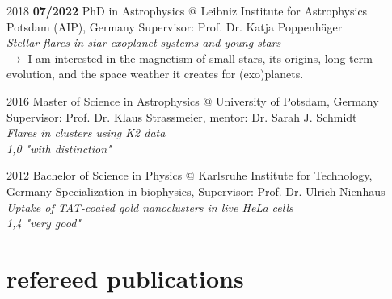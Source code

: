 \documentclass[9.5pt]{k-cv} %
\begin{document}
\begin{entrylist}
\entry
{2018 \to \textbf{07/2022}}
{PhD {\normalfont in Astrophysics} @ Leibniz Institute for Astrophysics Potsdam (AIP), Germany}
{}
{Supervisor: Prof. Dr. Katja Poppenh\"ager\\
\emph{Stellar flares in star-exoplanet systems and young stars}\vspace{.3cm}\\
$\rightarrow$ I am interested in the magnetism of small stars, its origins, long-term evolution, and the space weather it creates for (exo)planets.\vspace{.3cm}}

\entry
{2016 }
{Master {\normalfont of Science in Astrophysics} @ University of Potsdam, Germany}
{}
{Supervisor: Prof. Dr. Klaus Strassmeier, mentor: Dr. Sarah J. Schmidt\\
\emph{Flares in clusters using K2 data}\\ \emph{1,0 "with distinction"}}%


\entry
{2012 }
{Bachelor {\normalfont of Science in Physics} @ Karlsruhe Institute for Technology, Germany}
{}
{Specialization in biophysics, Supervisor: Prof. Dr. Ulrich Nienhaus\\
\emph{Uptake of TAT-coated gold nanoclusters in live HeLa cells}\\
\emph{1,4 "very good"}}
\end{entrylist}



\section{refereed publications}

\end{document}
